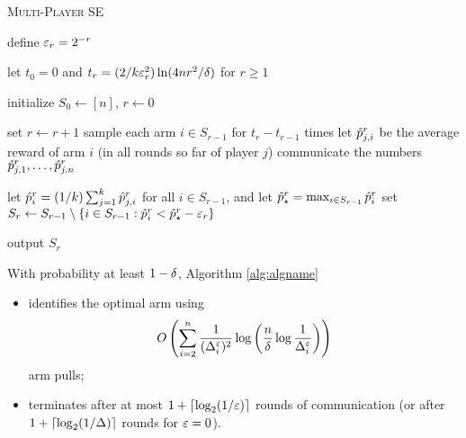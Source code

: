 \begin{algorithm} \caption{\textsc{Multi-Player SE}} \label{alg:algname}
\begin{algorithmic}[1]

\INPUT{$(\eps,\del)$}

\STATE define $\varepsilon_r = 2^{-r}$

\STATE let $t_0 = 0$ and
$
	t_r = (2/k\varepsilon_r^2) \ln (4 n r^2/\delta)
$
for $r \ge 1$

\STATE initialize $S_0 \gets [n]$, $r \gets 0$

\REPEAT
	\STATE set $r \gets r+1$
		\STATE sample each arm $i \in S_{r-1}$  for $t_r - t_{r-1}$ times
		\STATE let $\hat{p}_{j,i}^r$ be the average reward of arm $i$ (in all rounds
		so far of player $j$) 
		\STATE communicate the numbers $\hat{p}_{j,1}^r, \ldots,
		\hat{p}_{j,n}^r$
	\ENDFOR
	
	\STATE let $\hat{p}_i^r = (1/k) \sum_{j=1}^k \hat{p}_{j,i}^r$ for all $i \in S_{r-1}$,
		and let $\hat{p}_{\star}^r = \max_{i \in S_{r-1}} \hat{p}_i^r$
	\STATE set 
		$
		S_r \gets S_{r-1} \setminus 
		\{i \in S_{r-1} : \hat{p}_i^r < \hat{p}_{\star}^r - \varepsilon_r\}
		$

\STATE output $S_r$

\end{algorithmic}
\end{algorithm}



\begin{theorem} \label{thm:main1}

With probability at least $1-\delta$, Algorithm \ref{alg:algname}
\begin{itemize}
\item
identifies the optimal arm using
\begin{align*}
	O\left(\sum_{i=2}^{n}
		\frac{1}{(\Delta^{\varepsilon}_i)^2} \log \left(\frac{n}{\delta} \log \frac{1}{\Delta^{\varepsilon}_i}\right)
	\right)
\end{align*}
arm pulls;
\item
terminates after at most $1+\lceil\log_2(1/\varepsilon)\rceil$ rounds of communication (or after $1+\lceil\log_2(1/\Delta)\rceil$ rounds for $\varepsilon=0$).
\end{itemize}

\end{theorem}





